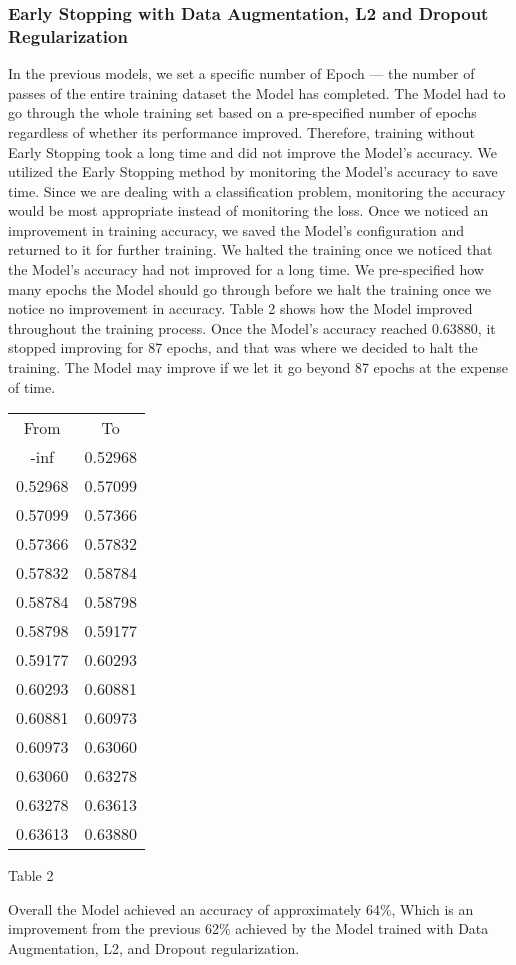 \documentclass[oneside,12pt,article]{article}
\begin{document}
\subsubsection{Early Stopping with Data Augmentation, L2 and Dropout Regularization}
In the previous models, we set a specific number of Epoch — the number of passes of the entire training dataset the Model has completed. The Model had to go through the whole training set based on a pre-specified number of epochs regardless of whether its performance improved. Therefore, training without Early Stopping took a long time and did not improve the Model's accuracy. We utilized the Early Stopping method by monitoring the Model's accuracy to save time. Since we are dealing with a classification problem, monitoring the accuracy would be most appropriate instead of monitoring the loss. Once we noticed an improvement in training accuracy, we saved the Model's configuration and returned to it for further training. We halted the training once we noticed that the Model's accuracy had not improved for a long time. We pre-specified how many epochs the Model should go through before we halt the training once we notice no improvement in accuracy. Table 2 shows how the Model improved throughout the training process. Once the Model's accuracy reached 0.63880, it stopped improving for 87 epochs, and that was where we decided to halt the training. The Model may improve if we let it go beyond 87 epochs at the expense of time. 


\begin{center}
\begin{tabular}{ |c|c|} 
 \hline
 From & To \\ 
 -inf & 0.52968 \\
0.52968 & 0.57099 \\ 
0.57099 & 0.57366 \\ 
0.57366 & 0.57832 \\  
0.57832 & 0.58784 \\ 
0.58784 & 0.58798 \\ 
0.58798 & 0.59177 \\ 
0.59177 & 0.60293 \\ 
0.60293 & 0.60881 \\ 
0.60881 & 0.60973 \\ 
0.60973 & 0.63060 \\ 
0.63060 & 0.63278 \\ 
0.63278 & 0.63613 \\ 
0.63613 & 0.63880 \\ 
 \hline
\end{tabular}
\begin{center}
 Table 2
 \end{center}
\end{center}
Overall the Model achieved an accuracy of approximately 64\%, Which is an improvement from the previous 62\% achieved by the Model trained with Data Augmentation, L2, and Dropout regularization. 
\end{document}
